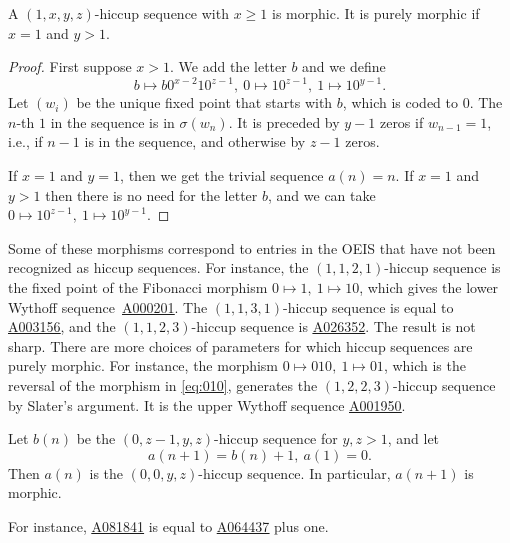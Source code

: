 \documentclass[12pt,reqno]{article}
\newcommand{\seqnum}[1]{\href{https://oeis.org/#1}{\rm \underline{#1}}}
\begin{document}
\begin{lemma}\label{lem:1xyz1}
    A $(1,x,y,z)$-hiccup sequence with $x\geq 1$
    is morphic. It is purely morphic if $x=1$ and $y>1$.
\end{lemma}
\begin{proof}
    First suppose $x>1$.
    We add the letter $b$ and we define
    \[b\mapsto b0^{x-2}10^{z-1},\ 0\mapsto 10^{z-1},\ 1\mapsto 10^{y-1}.\]
    Let $(w_i)$ be the unique fixed point that starts with $b$, which
    is coded to $0$. The $n$-th $1$ in the sequence is in $\sigma(w_n)$.
    It is preceded by $y-1$ zeros if $w_{n-1}=1$, i.e., if $n-1$ is
    in the sequence, and otherwise by $z-1$ zeros.

    If $x=1$ and $y=1$,
    then we get the trivial sequence $a(n)=n$.
    If $x=1$ and $y>1$ then there is no need for the letter $b$, and we can
    take $ 0\mapsto 10^{z-1},\ 1\mapsto 10^{y-1}$.
\end{proof}

Some of these morphisms correspond to entries in the OEIS that have not been recognized
as hiccup sequences.
For instance, the $(1,1,2,1)$-hiccup sequence is the fixed point of the Fibonacci morphism 
$0\mapsto 1,\ 1\mapsto 10$, which gives the lower Wythoff sequence~\seqnum{A000201}. The
$(1,1,3,1)$-hiccup sequence is equal to \seqnum{A003156}, and the $(1,1,2,3)$-hiccup sequence
is \seqnum{A026352}. The result is not sharp. There are more choices of
parameters for which hiccup sequences are purely morphic.
For instance, the morphism $0\mapsto 010,\ 1\mapsto 01$, which is the reversal of the morphism in
\ref{eq:010}, generates
the $(1,2,2,3)$-hiccup sequence by Slater's argument. It is the upper Wythoff sequence \seqnum{A001950}.

\begin{lemma}\label{lem:00yz}
    Let $b(n)$ be the $(0,z-1,y,z)$-hiccup sequence for $y,z>1$, and let 
    \[a(n+1)=b(n)+1,\ a(1)=0.\]
    Then $a(n)$ is the $(0,0,y,z)$-hiccup sequence.
    In particular, $a(n+1)$ is morphic.
\end{lemma}

For instance, \seqnum{A081841} is equal to \seqnum{A064437} plus one.
\end{document}
